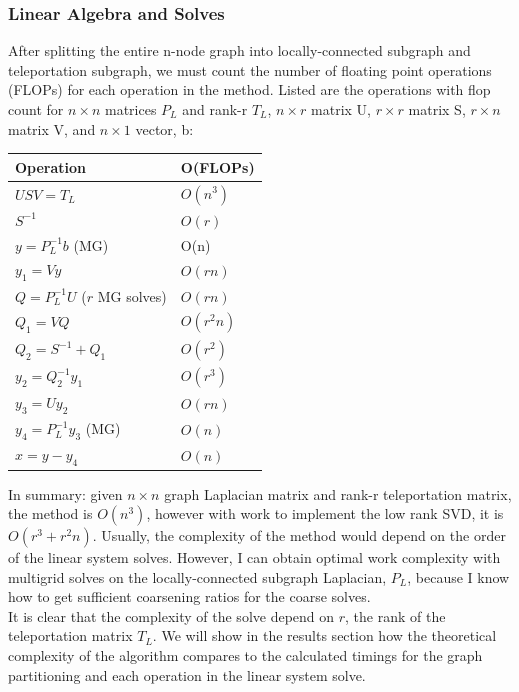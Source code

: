 \documentclass{article}
\begin{document}
\subsubsection{Linear Algebra and Solves}
After splitting the entire n-node graph into locally-connected subgraph and teleportation subgraph, we must count the number of floating point operations (FLOPs) for each operation in the method. Listed are the operations with flop count for $n\times n$ matrices $P_L$ and rank-r $T_L$, $n\times r$ matrix U, $r\times r$ matrix S, $r\times n$ matrix V, and $n\times 1$ vector, b:\\
\begin{spacing}{1}
\begin{center}
\renewcommand{\arraystretch}{1.5}
    \begin{tabular}{ | l | l |}
    \hline
    \textbf{Operation} & \textbf{O(FLOPs)} \\ \hline
    $USV = T_L$ & $O(n^3)$ \\ \hline
    $S^{-1}$ & $O(r)$ \\ \hline
    $y = P_L^{-1}b$ (MG) & O(n)  \\  \hline
    $y_1 = Vy$ & $O(rn)$ \\ \hline
    $Q = P_L^{-1}U$ ($r$ MG solves) & $O(rn)$ \\ \hline
    $Q_1 = VQ$ & $O(r^2 n)$ \\ \hline
    $Q_2 = S^{-1} + Q_1$ & $O(r^2)$ \\ \hline
    $y_2 = Q_2^{-1}y_1$ & $O(r^3)$ \\ \hline
    $y_3 = Uy_2$ & $O(rn)$ \\ \hline
    $y_4 = P_L^{-1}y_3$ (MG) & $O(n)$ \\ \hline
    $x = y - y_4$ & $O(n)$ \\
    \hline
    \end{tabular}
\end{center}
\end{spacing}
\vspace{.2in}
In summary: given $n\times n$ graph Laplacian matrix and rank-r teleportation matrix, the method is $O(n^3)$, however with work to implement the low rank SVD, it is $O(r^3+r^2 n)$. Usually, the complexity of the method would depend on the order of the linear system solves. However, I can obtain optimal work complexity with multigrid solves on the locally-connected subgraph Laplacian, $P_L$, because I know how to get sufficient coarsening ratios for the coarse solves.\\
It is clear that the complexity of the solve depend on $r$, the rank of the teleportation matrix $T_L$. We will show in the results section how the theoretical complexity of the algorithm compares to the calculated timings for the graph partitioning and each operation in the linear system solve.





%
%
\end{document}
